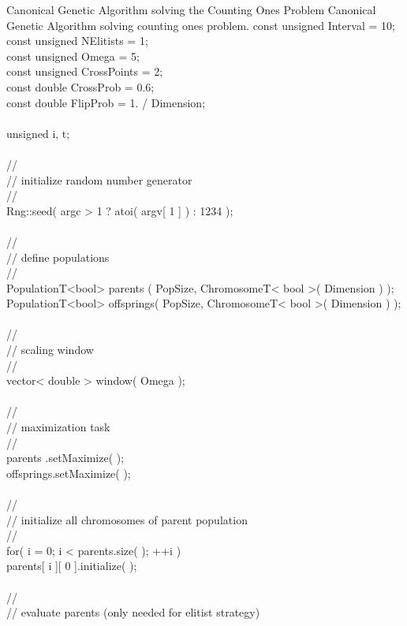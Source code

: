 \begin{programlisting}{Canonical Genetic Algorithm solving the Counting Ones Problem}{
    Canonical Genetic Algorithm solving counting ones problem.}
    const unsigned Interval    = 10;\\
    const unsigned NElitists   = 1;\\
    const unsigned Omega       = 5;\\
    const unsigned CrossPoints = 2;\\
    const double   CrossProb   = 0.6;\\
    const double   FlipProb    = 1. / Dimension;\\
\\
    unsigned i, t;\\
\\
    //\\
    // initialize random number generator\\
    //\\
    Rng::seed( argc > 1 ? atoi( argv[ 1 ] ) : 1234 );\\
\\
    //\\
    // define populations\\
    //\\
    PopulationT<bool> parents   ( PopSize, ChromosomeT< bool >( Dimension ) );\\
    PopulationT<bool> offsprings( PopSize, ChromosomeT< bool >( Dimension ) );\\
\\
    //\\
    // scaling window\\
    //\\
    vector< double > window( Omega );\\
\\
    //\\
    // maximization task\\
    //\\
    parents   .setMaximize( );\\
    offsprings.setMaximize( );\\
\\
    //\\
    // initialize all chromosomes of parent population\\
    //\\
    for( i = 0; i < parents.size( ); ++i )\\
            parents[ i ][ 0 ].initialize( );\\
\\
    //\\
    // evaluate parents (only needed for elitist strategy)\\

\end{programlisting}
